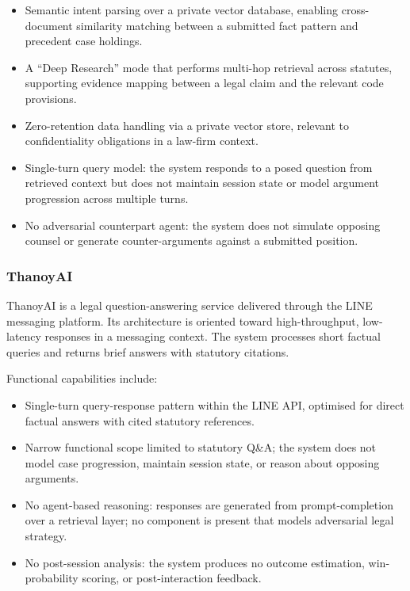 \begin{itemize}
    \item Semantic intent parsing over a private vector database, enabling cross-document
    similarity matching between a submitted fact pattern and precedent case holdings.

    \item A ``Deep Research'' mode that performs multi-hop retrieval across statutes,
    supporting evidence mapping between a legal claim and the relevant code provisions.

    \item Zero-retention data handling via a private vector store, relevant to
    confidentiality obligations in a law-firm context.

    \item Single-turn query model: the system responds to a posed question from retrieved
    context but does not maintain session state or model argument progression across
    multiple turns.

    \item No adversarial counterpart agent: the system does not simulate opposing counsel
    or generate counter-arguments against a submitted position.
\end{itemize}

\subsubsection{ThanoyAI}

ThanoyAI is a legal question-answering service delivered through the LINE messaging
platform. Its architecture is oriented toward high-throughput, low-latency responses in a
messaging context. The system processes short factual queries and returns brief answers
with statutory citations.

Functional capabilities include:

\begin{itemize}
    \item Single-turn query-response pattern within the LINE API, optimised for direct
    factual answers with cited statutory references.

    \item Narrow functional scope limited to statutory Q\&A; the system does not model
    case progression, maintain session state, or reason about opposing arguments.

    \item No agent-based reasoning: responses are generated from prompt-completion over
    a retrieval layer; no component is present that models adversarial legal strategy.

    \item No post-session analysis: the system produces no outcome estimation,
    win-probability scoring, or post-interaction feedback.
\end{itemize}


